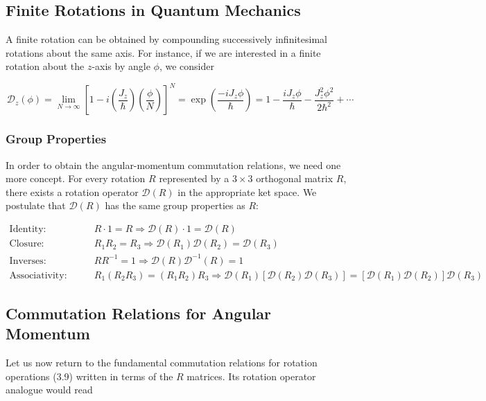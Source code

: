 \documentclass[11pt,a4paper]{article}
\begin{document}
\subsection{Finite Rotations in Quantum Mechanics}

A finite rotation can be obtained by compounding successively infinitesimal rotations about the same axis. For instance, if we are interested in a finite rotation about the $z$-axis by angle $\phi$, we consider

\begin{equation}
\boxed{\mathscr{D}_z(\phi) = \lim_{N \to \infty}\left[1 - i\left(\frac{J_z}{\hbar}\right)\left(\frac{\phi}{N}\right)\right]^N = \exp\left(\frac{-iJ_z\phi}{\hbar}\right) = 1 - \frac{iJ_z\phi}{\hbar} - \frac{J_z^2\phi^2}{2\hbar^2} + \cdots}
\tag{3.16}
\end{equation}

\subsubsection{Group Properties}

In order to obtain the angular-momentum commutation relations, we need one more concept. For every rotation $R$ represented by a $3 \times 3$ orthogonal matrix $R$, there exists a rotation operator $\mathscr{D}(R)$ in the appropriate ket space. We postulate that $\mathscr{D}(R)$ has the same group properties as $R$:

\begin{align}
\text{Identity:} \qquad & R \cdot 1 = R \Rightarrow \mathscr{D}(R) \cdot 1 = \mathscr{D}(R) \tag{3.17a} \\
\text{Closure:} \qquad & R_1 R_2 = R_3 \Rightarrow \mathscr{D}(R_1)\mathscr{D}(R_2) = \mathscr{D}(R_3) \tag{3.17b} \\
\text{Inverses:} \qquad & RR^{-1} = 1 \Rightarrow \mathscr{D}(R)\mathscr{D}^{-1}(R) = 1 \tag{3.17c} \\
\text{Associativity:} \qquad & R_1(R_2 R_3) = (R_1 R_2)R_3 \Rightarrow \mathscr{D}(R_1)[\mathscr{D}(R_2)\mathscr{D}(R_3)] = [\mathscr{D}(R_1)\mathscr{D}(R_2)]\mathscr{D}(R_3) \tag{3.17d}
\end{align}

\subsection{Commutation Relations for Angular Momentum}

Let us now return to the fundamental commutation relations for rotation operations (3.9) written in terms of the $R$ matrices. Its rotation operator analogue would read
\end{document}
